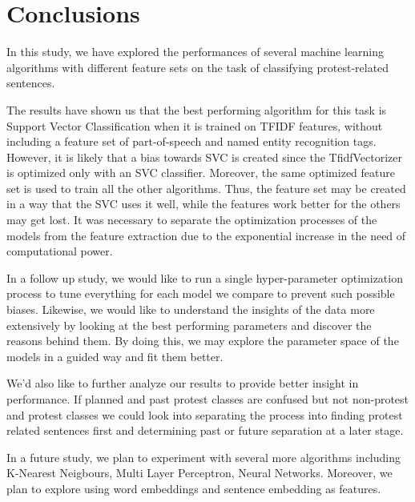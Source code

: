 \documentclass{article}
\begin{document}
\section{Conclusions}

In this study, we have explored the performances of several machine learning algorithms with different feature sets on the task of classifying protest-related sentences.

The results have shown us that the best performing algorithm for this task is Support Vector Classification when it is trained on TFIDF features, without including a feature set of part-of-speech and named entity recognition tags. However, it is likely that a bias towards SVC is created since the TfidfVectorizer is optimized only with an SVC classifier. Moreover, the same optimized feature set is used to train all the other algorithms. Thus, the feature set may be created in a way that the SVC uses it well, while the features work better for the others may get lost. It was necessary to separate the optimization processes of the models from the feature extraction due to the exponential increase in the need of computational power.

In a follow up study, we would like to run a single hyper-parameter optimization process to tune everything for each model we compare to prevent such possible biases. Likewise, we would like to understand the insights of the data more extensively by looking at the best performing parameters and discover the reasons behind them. By doing this, we may explore the parameter space of the models in a guided way and fit them better.

We'd also like to further analyze our results to provide better insight in performance. If planned and past protest classes are confused but not non-protest and protest classes we could look into separating the process into finding protest related sentences first and determining past or future separation at a later stage.

In a future study, we plan to experiment with several more algorithms including K-Nearest Neigbours, Multi Layer Perceptron, Neural Networks. Moreover, we plan to explore using word embeddings and sentence embedding as features.


\end{document}

